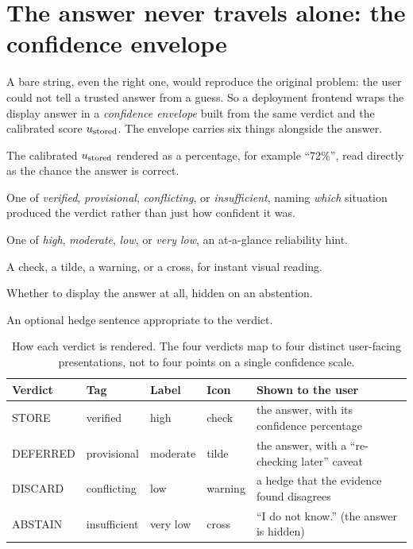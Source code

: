 \section{The answer never travels alone: the confidence envelope}
\label{sec:output-envelope}

A bare string, even the right one, would reproduce the original problem: the user
could not tell a trusted answer from a guess. So a deployment frontend wraps the
display answer in a \emph{confidence envelope} built from the same verdict and the
calibrated score $u_{\text{stored}}$. The envelope carries six things alongside the answer.

\begin{description}[leftmargin=0pt, labelsep=0.5em, style=nextline]
  \item[A continuous score.] The calibrated $u_{\text{stored}}$ rendered as a percentage, for
  example ``72\%'', read directly as the chance the answer is correct.
  \item[A semantic tag.] One of \emph{verified}, \emph{provisional},
  \emph{conflicting}, or \emph{insufficient}, naming \emph{which} situation produced
  the verdict rather than just how confident it was.
  \item[An ordinal label.] One of \emph{high}, \emph{moderate}, \emph{low}, or
  \emph{very low}, an at-a-glance reliability hint.
  \item[An icon.] A check, a tilde, a warning, or a cross, for instant visual reading.
  \item[A show-or-hide flag.] Whether to display the answer at all, hidden on an
  abstention.
  \item[A caveat.] An optional hedge sentence appropriate to the verdict.
\end{description}

\begin{table}[htbp]
\centering
\caption[The confidence envelope]{How each verdict is rendered. The four verdicts map
to four distinct user-facing presentations, not to four points on a single confidence
scale.}
\label{tab:envelope}
\small
\renewcommand{\arraystretch}{1.25}
\begin{tabularx}{\textwidth}{@{}l l l l >{\raggedright\arraybackslash}X@{}}
\toprule
\textbf{Verdict} & \textbf{Tag} & \textbf{Label} & \textbf{Icon} & \textbf{Shown to the user} \\
\midrule
STORE & verified & high & check & the answer, with its confidence percentage \\
DEFERRED & provisional & moderate & tilde & the answer, with a ``re-checking later'' caveat \\
DISCARD & conflicting & low & warning & a hedge that the evidence found disagrees \\
ABSTAIN & insufficient & very low & cross & ``I do not know.'' (the answer is hidden) \\
\bottomrule
\end{tabularx}
\end{table}

